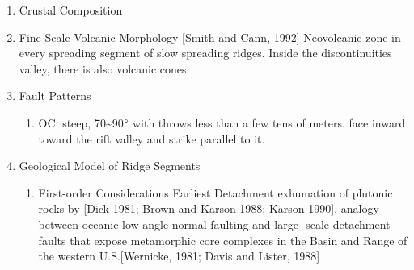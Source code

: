 \documentclass[11pt]{article}
\begin{document}
\begin{enumerate}
\begin{enumerate}
\label{sec-1-1-2-2-2}
\end{enumerate}
\item Crustal Composition
\label{sec-1-1-2-3}
\item Fine-Scale Volcanic Morphology
\label{sec-1-1-2-4}
[Smith and Cann, 1992] Neovolcanic zone in every spreading segment of slow spreading ridges. Inside the discontinuities valley, there is also volcanic cones.
\item Fault Patterns
\label{sec-1-1-2-5}
\begin{enumerate}
\item OC: steep, 70\textasciitilde{}90$\degree$ with throws less than a few tens of meters. face inward toward the rift valley and strike parallel to it.
\label{sec-1-1-2-5-1}
\end{enumerate}
\item Geological Model of Ridge Segments
\label{sec-1-1-2-6}
\begin{enumerate}
\item First-order Considerations
\label{sec-1-1-2-6-1}
Earliest Detachment exhumation of plutonic rocks by [Dick 1981; Brown and Karson 1988; Karson 1990], analogy between oceanic low-angle normal faulting and large -scale detachment faults that expose metamorphic core complexes in the Basin and Range of the western U.S.[Wernicke, 1981; Davis and Lister, 1988]

\end{enumerate}
\end{enumerate}
\end{document}

